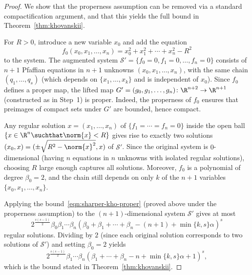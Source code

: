 \begin{proof}
We show that the properness assumption can be removed via a standard compactification argument, and that this yields the full bound in Theorem~\ref{thm:khovanskii}.

For $R > 0$, introduce a new variable $x_0$ and add the equation
\begin{equation*}
  f_0(x_0, x_1, \ldots, x_n) = x_0^2 + x_1^2 + \cdots + x_n^2 - R^2
\end{equation*}
to the system. The augmented system $\mathcal{S}' = \{f_0 = 0, f_1 = 0, \ldots, f_n = 0\}$ consists of $n+1$ Pfaffian equations in $n+1$ unknowns $(x_0, x_1, \ldots, x_n)$, with the same chain $(q_1, \ldots, q_s)$ (which depends on $\{x_1, \ldots, x_k\}$ and is independent of $x_0$). Since $f_0$ defines a proper map, the lifted map $G' = (g_0, g_1, \ldots, g_n)\colon \R^{n+2} \to \R^{n+1}$ (constructed as in Step~1) is proper. Indeed, the properness of $f_0$ ensures that preimages of compact sets under $G'$ are bounded, hence compact.

Any regular solution $x = (x_1, \ldots, x_n)$ of $\{f_1 = \cdots = f_n = 0\}$ inside the open ball $\{x \in \R^n \suchthat \norm{x} < R\}$ gives rise to exactly two solutions $(x_0, x) = (\pm\sqrt{R^2 - \norm{x}^2}, x)$ of $\mathcal{S}'$. Since the original system is $0$-dimensional (having $n$ equations in $n$ unknowns with isolated regular solutions), choosing $R$ large enough captures all solutions. Moreover, $f_0$ is a polynomial of degree $\beta_0 = 2$, and the chain still depends on only $k$ of the $n+1$ variables $\{x_0, x_1, \ldots, x_n\}$.

Applying the bound~\eqref{eqn:sharper-kho-proper} (proved above under the properness assumption) to the $(n+1)$-dimensional system $\mathcal{S}'$ gives at most
\begin{equation*}
  2^{\frac{s(s-1)}{2}} \beta_0 \beta_1 \dotsm \beta_n \left(\beta_0 + \beta_1 + \dotsb + \beta_n - (n+1) + \min\{k,s\}\alpha\right)^s
\end{equation*}
regular solutions. Dividing by $2$ (since each original solution corresponds to two solutions of $\mathcal{S}'$) and setting $\beta_0 = 2$ yields
\begin{equation*}
  2^{\frac{s(s-1)}{2}} \beta_1 \dotsm \beta_n \left(\beta_1 + \dotsb + \beta_n - n + \min\{k,s\}\alpha + 1\right)^s,
\end{equation*}
which is the bound stated in Theorem~\ref{thm:khovanskii}.
\end{proof}
